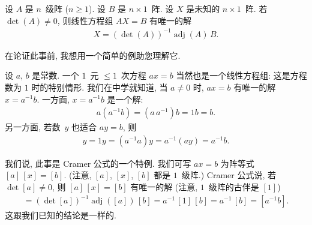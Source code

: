 \documentclass[../libro.tex]{subfiles}
\begin{document}
\begin{theorem}[Cramer 公式, 1]
    设 \(A\) 是 \(n\)~级阵 (\(n \geq 1\)).
    设 \(B\) 是 \(n \times 1\)~阵.
    设 \(X\) 是未知的 \(n \times 1\)~阵.
    若 \(\det {(A)} \neq 0\),
    则线性方程组 \(AX = B\) 有唯一的解
    \begin{align*}
        X = (\det {(A)})^{-1} \operatorname{adj} {(A)}\,B.
    \end{align*}
\end{theorem}

在论证此事前, 我想用一个简单的例助您理解它.

\begin{example}
    设 \(a\), \(b\) 是常数.
    一个 \(1\)~元 \({\leq} 1\)~次方程
    \(ax = b\)
    当然也是一个线性方程组:
    这是方程数为 \(1\) 时的特别情形.
    我们在中学就知道, 当 \(a \neq 0\) 时,
    \(ax = b\) 有唯一的解 \(x = a^{-1} b\).
    一方面, \(x = a^{-1} b\) 是一个解:
    \begin{align*}
        a (a^{-1} b)
        = (a\, a^{-1}) b
        = 1b
        = b.
    \end{align*}
    另一方面, 若数~\(y\) 也适合 \(ay = b\), 则
    \begin{align*}
        y
        = 1y
        = (a^{-1} a)y
        = a^{-1} (ay)
        = a^{-1} b.
    \end{align*}

    我们说, 此事是 Cramer 公式的一个特例.
    我们可写 \(ax = b\)
    为阵等式 \([a]\, [x] = [b]\).
    (注意, \([a]\), \([x]\), \([b]\) 都是 \(1\)~级阵.)
    Cramer 公式说, 若 \(\det {[a]} \neq 0\),
    则 \([a]\, [x] = [b]\)
    有唯一的解
    (注意, \(1\)~级阵的古伴是 \([1]\))
    \begin{align*}
        [x] = (\det {[a]})^{-1}
        \operatorname{adj} {([a])}\,[b]
        = a^{-1}\, [1]\,[b]
        = a^{-1}\, [b]
        = [ a^{-1} b ].
    \end{align*}
    这跟我们已知的结论是一样的.
\end{example}
\end{document}

